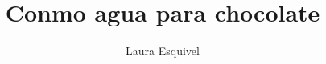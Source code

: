 \documentclass[fontsize=11pt]{scrartcl}
\begin{document}
\title{Conmo agua para chocolate}
\author{Laura Esquivel}
\date{}

\maketitle
\clearpage

\newcommand{\rn}[1]{\Rnode{#1}}
\newcommand{\rl}[2]{\ncline[linestyle=solid,arrows=->,nodesepA=0.5pt,linecolor=gray, strokeopacity=0.5]{#1}{#2}}
\newcommand{\sidenote}[1]{\marginpar[#1]{\small\textit{#1}}}
\newcommand{\grammarnote}[1]{\marginpar[#1]{\footnotesize{G#1}}}
\newcommand{\ul}[1]{\underline{#1}}
\newcommand{\nwfootnote}[1]{\footnote{#1}}
\newcommand{\fillmiss}{\rule{2cm}{0.4pt}~}
\newcommand{\choice}{$\Box$}
\newcommand{\correctchoice}{\framebox[1em]{\ding{51}}}
\newcommand{\falsechoice}{\framebox[1em]{\ding{53}}}
\newcommand{\correction}[1]{~\ding{43}~\textbf{\textsl{#1}}}
\newcommand{\FIN}{\textbf{--- FIN ---}\clearpage}

\newcommand{\mdash}{-}


\end{document}
